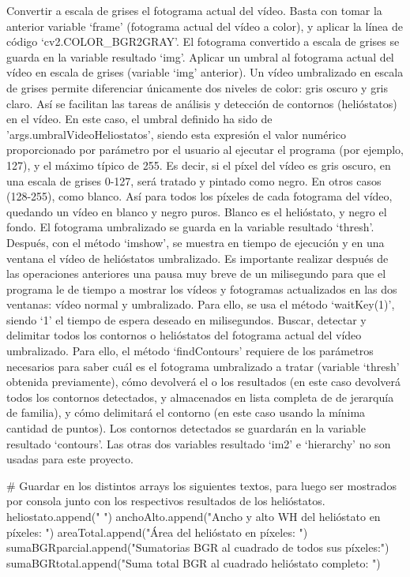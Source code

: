\documentclass[12pt]{article}
\begin{document}
Convertir a escala de grises el fotograma actual del vídeo. Basta con tomar la anterior variable ‘frame’ (fotograma actual del vídeo a color), y aplicar la línea de código ‘cv2.COLOR\_BGR2GRAY’. El fotograma convertido a escala de grises se guarda en la variable resultado ‘img’.
Aplicar un umbral al fotograma actual del vídeo en escala de grises (variable ‘img’ anterior). Un vídeo umbralizado en escala de grises permite diferenciar únicamente dos niveles de color: gris oscuro y gris claro. Así se facilitan las tareas de análisis y detección de contornos (helióstatos) en el vídeo. En este caso, el umbral definido ha sido de 'args.umbralVideoHeliostatos', siendo esta expresión el valor numérico proporcionado por parámetro por el usuario al ejecutar el programa (por ejemplo, 127), y el máximo típico de 255. Es decir, si el píxel del vídeo es gris oscuro, en una escala de grises 0-127, será tratado y pintado como negro. En otros casos (128-255), como blanco. Así para todos los píxeles de cada fotograma del vídeo, quedando un vídeo en blanco y negro puros. Blanco es el helióstato, y negro el fondo. El fotograma umbralizado se guarda en la variable resultado ‘thresh’. Después, con el método ‘imshow’, se muestra en tiempo de ejecución y en una ventana el vídeo de helióstatos umbralizado. Es importante realizar después de las operaciones anteriores una pausa muy breve de un milisegundo para que el programa le de tiempo a mostrar los vídeos y fotogramas actualizados en las dos ventanas: vídeo normal y umbralizado. Para ello, se usa el método ‘waitKey(1)’, siendo ‘1’ el tiempo de espera deseado en milisegundos.
Buscar, detectar y delimitar todos los contornos o helióstatos del fotograma actual del vídeo umbralizado. Para ello, el método ‘findContours’ requiere de los parámetros necesarios para saber cuál es el fotograma umbralizado a tratar (variable ‘thresh’ obtenida previamente), cómo devolverá el o los resultados (en este caso devolverá todos los contornos detectados, y almacenados en lista completa de de jerarquía de familia), y cómo delimitará el contorno (en este caso usando la mínima cantidad de puntos). Los contornos detectados se guardarán en la variable resultado ‘contours’. Las otras dos variables resultado ‘im2’ e ‘hierarchy’ no son usadas para este proyecto.


	\# Guardar en los distintos arrays los siguientes textos, para luego ser mostrados por consola junto con los respectivos resultados de los helióstatos.
    heliostato.append("                                               ")
    anchoAlto.append("Ancho y alto WH del helióstato en píxeles:      ")
    areaTotal.append("Área del helióstato en píxeles:                 ")
    sumaBGRparcial.append("Sumatorias BGR al cuadrado de todos sus píxeles:")
    sumaBGRtotal.append("Suma total BGR al cuadrado helióstato completo: ")
    
\end{document}
